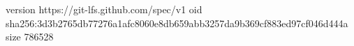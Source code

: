 version https://git-lfs.github.com/spec/v1
oid sha256:3d3b2765db77276a1afc8060e8db659abb3257da9b369cf883ed97cf046d444a
size 786528

